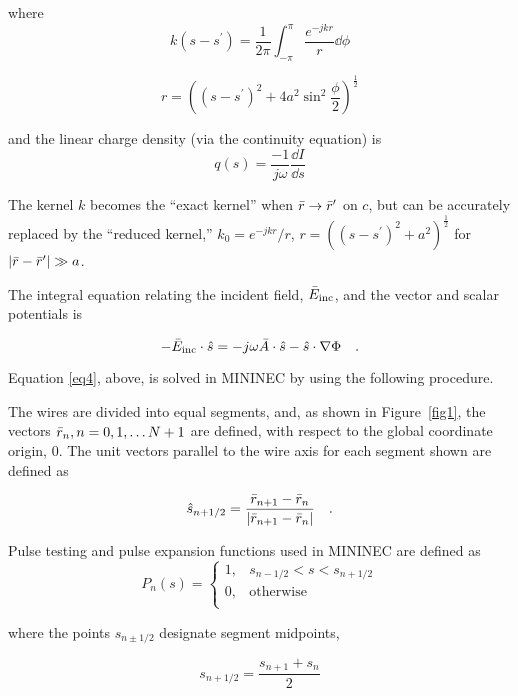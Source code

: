 \documentclass[12pt]{article}
\begin{document}
where
\[ k(s-s^\prime) = \frac{1}{2\pi}\int_{-\pi}^{\pi} \frac{e^{-jkr}}{r}\dd{\phi}
\]

\[ r = \left((s-s^\prime)^2 + 4a^2\sin^2\frac{\phi}{2}\right)^{\frac{1}{2}}
\]

and the linear charge density (via the continuity equation) is
\begin{equation}
q(s) = \frac{-1}{j\omega}\frac{\dd{I}}{\dd{s}}
\label{eq3}
\end{equation}

The kernel $k$ becomes the ``exact kernel'' when
$\bar{r}\rightarrow\bar{r}^\prime$ on $c$, but can be accurately
replaced by the ``reduced kernel,''
$k_0 = e^{-jkr}/r$, $r=\left((s - s^\prime)^2+a^2\right)^{\frac{1}{2}}$
for $|\bar{r}-\bar{r}^\prime| \gg a$.

The integral equation relating the incident field, $\bar{E}_{\mathrm{inc}}$, and the
vector and scalar potentials is

\begin{equation}
-\bar{E}_{\mathrm{inc}}\cdot\hat{s}=
-j\omega\bar{A}\cdot\hat{s}-\hat{s}\cdot\nabla\Phi
\quad .
\label{eq4}
\end{equation}

Equation \eqref{eq4}, above, is solved in MININEC by using the following
procedure.

The wires are divided into equal segments, and, as shown in
Figure~\ref{fig1}, the vectors $\bar{r}_n, n=0, 1, \ldots N+1$ are
defined, with respect to the global coordinate origin, $0$. The unit
vectors parallel to the wire axis for each segment shown are defined as

\begin{equation}
\hat{s}_{n+1/2} = \frac{\bar{r}_{n+1}
- \bar{r}_n}{|\bar{r}_{n+1}-\bar{r}_n|}
\quad .
\label{eq5}
\end{equation}

Pulse testing and pulse expansion functions used in MININEC are defined as
\begin{equation}
P_n(s) = \left\{
\begin{array}{ll}
1, & s_{n-1/2} < s < s_{n+1/2} \\
0, & \mathrm{otherwise}        \\
\end{array}\right.
\label{eq6}
\end{equation}

\noindent where the points $s_{n\pm1/2}$ designate segment midpoints,

\begin{equation}
s_{n+1/2} = \frac{s_{n+1} + s_n}{2}
\label{eq7}
\end{equation}
\end{document}
